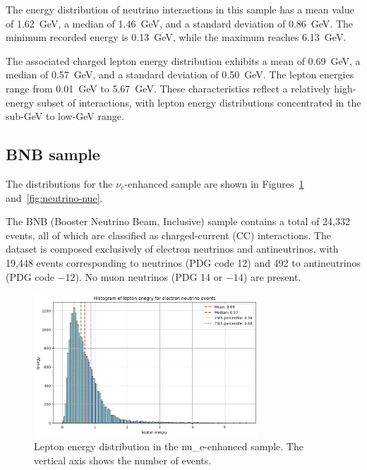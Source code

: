 \documentclass{pracalicmgr}
\begin{document}
The energy distribution of neutrino interactions in this sample has a mean value of 1.62~GeV, a median of 1.46~GeV, and a standard deviation of 0.86~GeV. The minimum recorded energy is 0.13~GeV, while the maximum reaches 6.13~GeV.

The associated charged lepton energy distribution exhibits a mean of 0.69~GeV, a median of 0.57~GeV, and a standard deviation of 0.50~GeV. The lepton energies range from 0.01~GeV to 5.67~GeV. These characteristics reflect a relatively high-energy subset of interactions, with lepton energy distributions concentrated in the sub-GeV to low-GeV range.

\subsection{BNB sample}

The distributions for the $\nu_e$-enhanced sample are shown in Figures~\ref{fig:lepton-nue} and~\ref{fig:neutrino-nue}.

The BNB (Booster Neutrino Beam, Inclusive) sample contains a total of 24,332 events, all of which are classified as charged-current (CC) interactions. The dataset is composed exclusively of electron neutrinos and antineutrinos, with 19,448 events corresponding to neutrinos (PDG code 12) and 492 to antineutrinos (PDG code $-12$). No muon neutrinos (PDG 14 or $-14$) are present.

\begin{figure}[H]
    \centering
    \includegraphics[width=0.75\textwidth]{src/leptonElectron.png}
    \caption{Lepton energy distribution in the nu\_e-enhanced sample. The vertical axis shows the number of events.}
    \label{fig:lepton-nue}
\end{figure}
\end{document}
